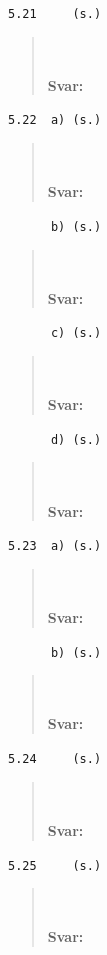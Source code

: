 \documentclass[a4paper]{article}
\newcommand{\tskcol}[1]{\textcolor{tskcol}{#1}}
\begin{document}
	\texttt{\tskcol{5.21~~~~ (s.)}}
	\begin{quotation}
		\noindent
		\\ \\
		\textbf{Svar:}
	\end{quotation}
	
	\texttt{\tskcol{5.22~~a) (s.)}}
	\begin{quotation}
		\noindent
		\\ \\
		\textbf{Svar:}
	\end{quotation}
	
	\texttt{\tskcol{~~~~~~b) (s.)}}
	\begin{quotation}
		\noindent
		\\ \\
		\textbf{Svar:}
	\end{quotation}
	
	\texttt{\tskcol{~~~~~~c) (s.)}}
	\begin{quotation}
		\noindent
		\\ \\
		\textbf{Svar:}
	\end{quotation}
	
	\texttt{\tskcol{~~~~~~d) (s.)}}
	\begin{quotation}
		\noindent
		\\ \\
		\textbf{Svar:}
	\end{quotation}
	
	\texttt{\tskcol{5.23~~a) (s.)}}
	\begin{quotation}
		\noindent
		\\ \\
		\textbf{Svar:}
	\end{quotation}
	
	\texttt{\tskcol{~~~~~~b) (s.)}}
	\begin{quotation}
		\noindent
		\\ \\
		\textbf{Svar:}
	\end{quotation}
	
	\texttt{\tskcol{5.24~~~~ (s.)}}
	\begin{quotation}
		\noindent
		\\ \\
		\textbf{Svar:}
	\end{quotation}
	
	\texttt{\tskcol{5.25~~~~ (s.)}}
	\begin{quotation}
		\noindent
		\\ \\
		\textbf{Svar:}
	\end{quotation}
	
\end{document}

